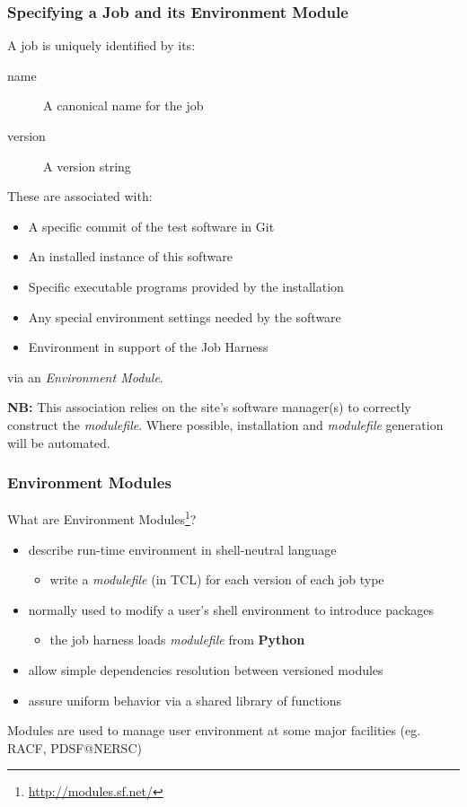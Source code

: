 \documentclass[xcolor=dvipsnames]{beamer}
\begin{document}
\begin{frame}
  \frametitle{Specifying a Job and its Environment Module}
  
  A job is uniquely identified by its:

  \begin{description}
  \item[name] A canonical name for the job
  \item[version] A version string
  \end{description}

  These are associated with:

  \begin{itemize}
  \item A specific commit of the test software in Git
  \item An installed instance of this software
  \item Specific executable programs provided by the installation
  \item Any special environment settings needed by the software
  \item Environment in support of the Job Harness
  \end{itemize}

  via an \textit{Environment Module}.

  \textbf{NB:} This association relies on the site's software
  manager(s) to correctly construct the \textit{modulefile}.  Where
  possible, installation and \textit{modulefile} generation will be
  automated.

\end{frame}

\begin{frame}
  \frametitle{Environment Modules}

  What are Environment Modules\footnote{\url{http://modules.sf.net/}}?
    
  \begin{itemize}
  \item describe run-time environment in shell-neutral language
    \begin{itemize}
    \item write a \textit{modulefile} (in TCL) for each version of each job type
    \end{itemize}
  \item normally used to modify a user's shell environment to introduce packages
    \begin{itemize}
    \item the job harness loads \textit{modulefile} from \textbf{Python}
    \end{itemize}
  \item allow simple dependencies resolution between versioned modules
  \item assure uniform behavior via a shared library of functions
  \end{itemize}

  Modules are used to manage user environment at some major facilities
  (eg. RACF, PDSF@NERSC)

\end{frame}
\end{document}
